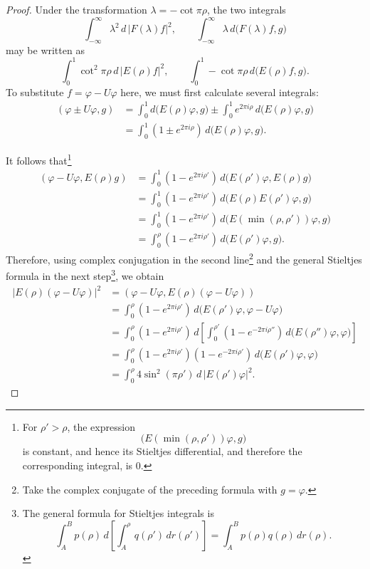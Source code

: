 ﻿\documentclass[paper=b5,fontsize=13pt,bookmarkpackage=false,twoside]{scrartcl}
\begin{document}
\begin{proof}
Under the transformation $\lambda=-\cot\pi\rho$, the two integrals
\[
\int_{-\infty}^{\infty}\lambda^2\,d\,|F(\lambda)f|^2,
\qquad
\int_{-\infty}^{\infty}\lambda\,d\bigl(F(\lambda)f,g\bigr)
\]
may be written as
\[
\int_0^1\cot^2\pi\rho\,d\,|E(\rho)f|^2,
\qquad
\int_0^1-\cot\pi\rho\,d\bigl(E(\rho)f,g\bigr).
\]
To substitute $f=\varphi-U\varphi$ here, we must first calculate several integrals:
\begin{align*}
(\varphi\pm U\varphi,g)
&=\int_0^1d\bigl(E(\rho)\varphi,g\bigr)
\pm\int_0^1e^{2\pi i\rho}\,d\bigl(E(\rho)\varphi,g\bigr)\\
&=\int_0^1(1\pm e^{2\pi i\rho})\,d\bigl(E(\rho)\varphi,g\bigr).
\end{align*}

It follows that\footnote{\label{fn:53}For $\rho'>\rho$, the expression
\[
\bigl(E(\min(\rho,\rho'))\varphi,g\bigr)
\]
is constant, and hence its Stieltjes differential, and therefore the corresponding integral, is $0$.}
\begin{align*}
(\varphi-U\varphi,E(\rho)g)
&=\int_0^1(1-e^{2\pi i\rho'})\,
d\bigl(E(\rho')\varphi,E(\rho)g\bigr)\\
&=\int_0^1(1-e^{2\pi i\rho'})\,
d\bigl(E(\rho)E(\rho')\varphi,g\bigr)\\
&=\int_0^1(1-e^{2\pi i\rho'})\,
d\bigl(E(\min(\rho,\rho'))\varphi,g\bigr)\\
&=\int_0^\rho(1-e^{2\pi i\rho'})\,
d\bigl(E(\rho')\varphi,g\bigr).
\end{align*}
Therefore, using complex conjugation in the second line\footnote{\label{fn:54}Take the complex conjugate of the preceding formula with $g=\varphi$.} and the general Stieltjes formula in the next step\footnote{\label{fn:55}The general formula for Stieltjes integrals is
\[
\int_A^Bp(\rho)\,
d\left[\int_A^\rho q(\rho')\,dr(\rho')\right]
=
\int_A^Bp(\rho)q(\rho)\,dr(\rho).
\]}, we obtain
\begin{align*}
|E(\rho)(\varphi-U\varphi)|^2
&=(\varphi-U\varphi,E(\rho)(\varphi-U\varphi))\\
&=\int_0^\rho(1-e^{2\pi i\rho'})\,
d\bigl(E(\rho')\varphi,\varphi-U\varphi\bigr)\\
&=\int_0^\rho(1-e^{2\pi i\rho'})\,
d\left[
\int_0^{\rho'}(1-e^{-2\pi i\rho''})\,
d\bigl(E(\rho'')\varphi,\varphi\bigr)
\right]\\
&=\int_0^\rho
(1-e^{2\pi i\rho'})(1-e^{-2\pi i\rho'})\,
d\bigl(E(\rho')\varphi,\varphi\bigr)\\
&=\int_0^\rho4\sin^2(\pi\rho')\,d\,|E(\rho')\varphi|^2.
\end{align*}

\end{proof}
\end{document}

